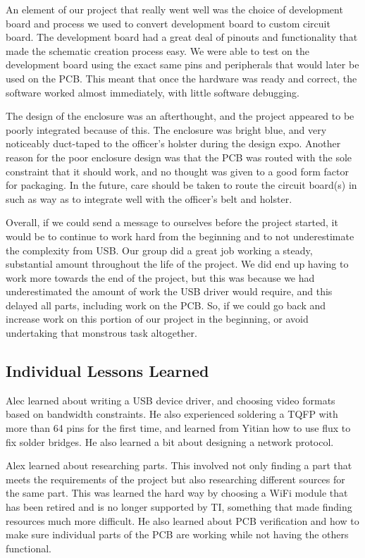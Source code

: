 \documentclass[12pt]{article}
\begin{document}
An element of our project that really went well was the choice of development
board and process we used to convert development board to custom circuit board.
The development board had a great deal of pinouts and functionality that made
the schematic creation process easy. We were able to test on the development
board using the exact same pins and peripherals that would later be used on the
PCB. This meant that once the hardware was ready and correct, the software
worked almost immediately, with little software debugging.

The design of the enclosure was an afterthought, and the project appeared to be
poorly integrated because of this. The enclosure was bright blue, and very
noticeably duct-taped to the officer’s holster during the design expo. Another
reason for the poor enclosure design was that the PCB was routed with the sole
constraint that it should work, and no thought was given to a good form factor
for packaging. In the future, care should be taken to route the circuit
board(s) in such as way as to integrate well with the officer’s belt and
holster.

Overall, if we could send a message to ourselves before the project started, it
would be to continue to work hard from the beginning and to not underestimate
the complexity from USB. Our group did a great job working a steady,
substantial amount throughout the life of the project. We did end up having to
work more towards the end of the project, but this was because we had
underestimated the amount of work the USB driver would require, and this
delayed all parts, including work on the PCB. So, if we could go back and
increase work on this portion of our project in the beginning, or avoid
undertaking that monstrous task altogether.

\subsection{Individual Lessons Learned}
Alec learned about writing a USB device driver, and choosing video formats
based on bandwidth constraints. He also experienced soldering a TQFP with more
than 64 pins for the first time, and learned from Yitian how to use flux to fix
solder bridges. He also learned a bit about designing a network protocol.

Alex learned about researching parts. This involved not only finding a part
that meets the requirements of the project but also researching different
sources for the same part. This was learned the hard way by choosing a WiFi
module that has been retired and is no longer supported by TI, something that
made finding resources much more difficult. He also learned about PCB
verification and how to make sure individual parts of the PCB are working while
not having the others functional. 
\end{document}
